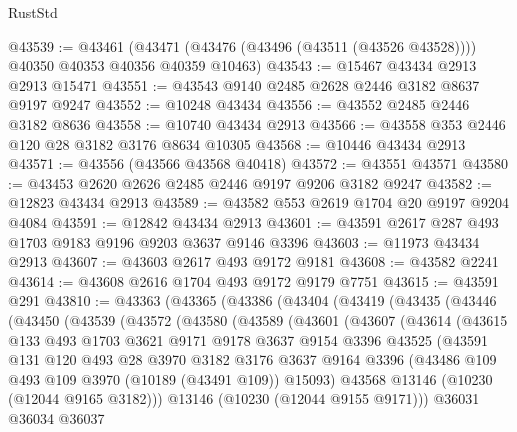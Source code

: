 \begin{lexlean}{RustStd}
\begin{coremodule}
@43539 := @43461
    (@43471 (@43476 (@43496 (@43511 (@43526 @43528)))) @40350 @40353 @40356 @40359 @10463)
@43543 := @15467 @43434 @2913 @2913 @15471
@43551 := @43543 @9140 @2485 @2628 @2446 @3182 @8637 @9197 @9247
@43552 := @10248 @43434
@43556 := @43552 @2485 @2446 @3182 @8636
@43558 := @10740 @43434 @2913
@43566 := @43558 @353 @2446 @120 @28 @3182 @3176 @8634 @10305
@43568 := @10446 @43434 @2913
@43571 := @43556 (@43566 @43568 @40418)
@43572 := @43551 @43571
@43580 := @43453 @2620 @2626 @2485 @2446 @9197 @9206 @3182 @9247
@43582 := @12823 @43434 @2913
@43589 := @43582 @553 @2619 @1704 @20 @9197 @9204 @4084
@43591 := @12842 @43434 @2913
@43601 := @43591 @2617 @287 @493 @1703 @9183 @9196 @9203 @3637 @9146 @3396
@43603 := @11973 @43434 @2913
@43607 := @43603 @2617 @493 @9172 @9181
@43608 := @43582 @2241
@43614 := @43608 @2616 @1704 @493 @9172 @9179 @7751
@43615 := @43591 @291
@43810 := @43363
    (@43365
      (@43386
        (@43404
          (@43419
            (@43435
              (@43446
                (@43450
                  (@43539
                    (@43572
                      (@43580
                        (@43589
                          (@43601
                            (@43607
                              (@43614
                                (@43615
                                  @133
                                  @493
                                  @1703
                                  @3621
                                  @9171
                                  @9178
                                  @3637
                                  @9154
                                  @3396
                                  @43525
                                  (@43591
                                    @131
                                    @120
                                    @493
                                    @28
                                    @3970
                                    @3182
                                    @3176
                                    @3637
                                    @9164
                                    @3396
                                    (@43486 @109 @493 @109 @3970 (@10189 (@43491 @109)) @15093)
                                    @43568
                                    @13146
                                    (@10230 (@12044 @9165 @3182)))
                                  @13146
                                  (@10230 (@12044 @9155 @9171)))
                                @36031
                                @36034
                                @36037

\end{coremodule}
\end{lexlean}
